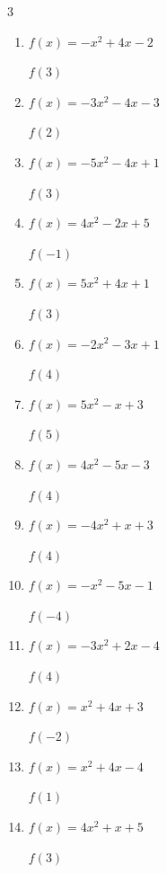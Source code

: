\begin{multicols}{3}
\begin{enumerate}
$f(-3)$
        \phantom{$= 46$}

  \item $f(x)=-x^{2}+4x-2$

$f(3)$
        \phantom{$= 1$}

  \item $f(x)=-3x^{2}-4x-3$

$f(2)$
        \phantom{$= -23$}

  \item $f(x)=-5x^{2}-4x+1$

$f(3)$
        \phantom{$= -56$}

  \item $f(x)=4x^{2}-2x+5$

$f(-1)$
        \phantom{$= 11$}

  \item $f(x)=5x^{2}+4x+1$

$f(3)$
        \phantom{$= 58$}

  \item $f(x)=-2x^{2}-3x+1$

$f(4)$
        \phantom{$= -43$}

  \item $f(x)=5x^{2}-x+3$

$f(5)$
        \phantom{$= 123$}

  \item $f(x)=4x^{2}-5x-3$

$f(4)$
        \phantom{$= 41$}

  \item $f(x)=-4x^{2}+x+3$

$f(4)$
        \phantom{$= -57$}

  \item $f(x)=-x^{2}-5x-1$

$f(-4)$
        \phantom{$= 3$}

  \item $f(x)=-3x^{2}+2x-4$

$f(4)$
        \phantom{$= -44$}

  \item $f(x)=x^{2}+4x+3$

$f(-2)$
        \phantom{$= -1$}

  \item $f(x)=x^{2}+4x-4$

$f(1)$
        \phantom{$= 1$}

  \item $f(x)=4x^{2}+x+5$

$f(3)$
        \phantom{$= 44$}


\end{enumerate}
\end{multicols}
